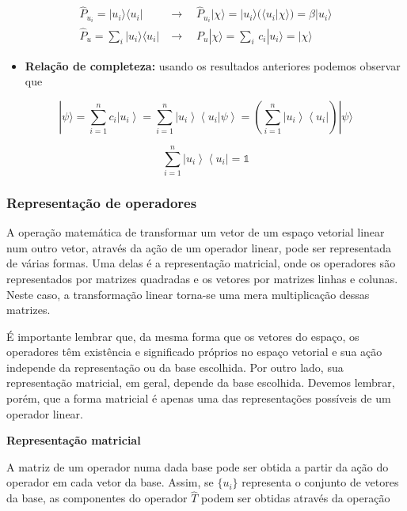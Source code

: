 \documentclass[11pt]{article}
\providecommand{\tightlist}{%
      \setlength{\itemsep}{0pt}\setlength{\parskip}{0pt}}
\begin{document}
\[
\begin{array}{ll}
\hat{P}_{u_i} = | u_i \rangle \langle u_i |  &\rightarrow \quad \hat{P}_{u_i} | \chi\rangle = | u_i \rangle (\langle u_i |\chi\rangle) = \beta | u_i \rangle \\
\hat{P}_{u} = \sum_i | u_i \rangle \langle u_i |  &\rightarrow \quad  {P}_{u} | \chi\rangle = \sum_i \,c_i | u_i \rangle = | \chi\rangle
\end{array}
\]

\begin{itemize}
\tightlist
\item
  \textbf{Relação de completeza:} usando os resultados anteriores
  podemos observar que
\end{itemize}

\[
|\psi\rangle=\sum_{i=1}^{n}c_i\left|u_{i}\right\rangle = \sum_{i=1}^{n}\left|u_{i}\right\rangle\left\langle u_{i} | \psi\right\rangle=\left(\sum_{i=1}^{n}\left|u_{i}\right\rangle\left\langle u_{i}\right|\right)|\psi\rangle
\]

\[
\sum_{i=1}^{n}\left|u_{i}\right\rangle\left\langle u_{i}\right| = \mathbb{1}
\]

    \hypertarget{representauxe7uxe3o-de-operadores}{%
\subsubsection{Representação de
operadores}\label{representauxe7uxe3o-de-operadores}}

A operação matemática de transformar um vetor de um espaço vetorial
linear num outro vetor, através da ação de um operador linear, pode ser
representada de várias formas. Uma delas é a representação matricial,
onde os operadores são representados por matrizes quadradas e os vetores
por matrizes linhas e colunas. Neste caso, a transformação linear
torna-se uma mera multiplicação dessas matrizes.

É importante lembrar que, da mesma forma que os vetores do espaço, os
operadores têm existência e significado próprios no espaço vetorial e
sua ação independe da representação ou da base escolhida. Por outro
lado, sua representação matricial, em geral, depende da base escolhida.
Devemos lembrar, porém, que a forma matricial é apenas uma das
representações possíveis de um operador linear.

\textbf{Representação matricial}

A matriz de um operador numa dada base pode ser obtida a partir da ação
do operador em cada vetor da base. Assim, se \(\{ u_i \}\) representa o
conjunto de vetores da base, as componentes do operador \(\hat{T}\)
podem ser obtidas através da operação
\end{document}
